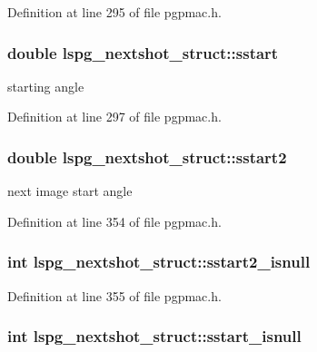 Definition at line 295 of file pgpmac.\-h.

\hypertarget{structlspg__nextshot__struct_a8dc11eaa094d59f61642c4abc226918f}{
\subsubsection[{sstart}]{\setlength{\rightskip}{0pt plus 5cm}double lspg\-\_\-nextshot\-\_\-struct\-::sstart}}\label{structlspg__nextshot__struct_a8dc11eaa094d59f61642c4abc226918f}


starting angle 



Definition at line 297 of file pgpmac.\-h.

\hypertarget{structlspg__nextshot__struct_a8445cbd2206dc6d62b6bd433f5218c98}{
\subsubsection[{sstart2}]{\setlength{\rightskip}{0pt plus 5cm}double lspg\-\_\-nextshot\-\_\-struct\-::sstart2}}\label{structlspg__nextshot__struct_a8445cbd2206dc6d62b6bd433f5218c98}


next image start angle 



Definition at line 354 of file pgpmac.\-h.

\hypertarget{structlspg__nextshot__struct_a240c8532d5ce48dbc872d5123a4e721c}{
\subsubsection[{sstart2\-\_\-isnull}]{\setlength{\rightskip}{0pt plus 5cm}int lspg\-\_\-nextshot\-\_\-struct\-::sstart2\-\_\-isnull}}\label{structlspg__nextshot__struct_a240c8532d5ce48dbc872d5123a4e721c}


Definition at line 355 of file pgpmac.\-h.

\hypertarget{structlspg__nextshot__struct_aa53094de91e2f69d7174ab119df1cdac}{
\subsubsection[{sstart\-\_\-isnull}]{\setlength{\rightskip}{0pt plus 5cm}int lspg\-\_\-nextshot\-\_\-struct\-::sstart\-\_\-isnull}}\label{structlspg__nextshot__struct_aa53094de91e2f69d7174ab119df1cdac}


